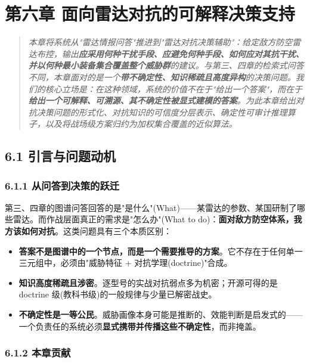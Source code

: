 \documentclass[12pt,a4paper]{ctexart}
\begin{document}
\section*{第六章 面向雷达对抗的可解释决策支持}

\begin{quote}\itshape 本章将系统从"雷达情报问答"推进到"雷达对抗决策辅助"：给定敌方防空雷达布控，输出\textbf{应采用何种干扰手段、应避免何种手段、如何应对其抗干扰、并以何种最小装备集合覆盖整个威胁群}的建议。与第三、四章的检索式问答不同，本章面对的是一个\textbf{带不确定性、知识稀疏且高度异构}的决策问题。我们的核心立场是：在这种领域，系统的价值不在于"给出一个答案"，而在于\textbf{给出一个可解释、可溯源、其不确定性被显式建模的答案}。为此本章给出对抗决策问题的形式化、对抗知识的可信度分层表示、确定性可审计推理算子，以及将战场级方案归约为加权集合覆盖的近似算法。\end{quote}


\subsection*{6.1 引言与问题动机}

\subsubsection*{6.1.1 从问答到决策的跃迁}

第三、四章的图谱问答回答的是"是什么"(What)——某雷达的参数、某国研制了哪些雷达。而作战层面真正的需求是"怎么办"(What to do)：\textbf{面对敌方防空体系，我方该如何对抗}。这类问题具有三个本质区别：

\begin{itemize}[leftmargin=2em]
\item \textbf{答案不是图谱中的一个节点，而是一个需要推导的方案}。它不存在于任何单一三元组中，必须由"威胁特征 + 对抗学理(doctrine)"合成。
\item \textbf{知识高度稀疏且涉密}。逐型号的实战对抗弱点多为机密；开源可得的是 doctrine 级(教科书级)的一般规律与少量已解密战史。
\item \textbf{不确定性是一等公民}。威胁画像本身可能是推断的、效能判断是启发式的——一个负责任的系统必须\textbf{显式携带并传播这些不确定性}，而非掩盖。
\end{itemize}

\subsubsection*{6.1.2 本章贡献}
\end{document}
